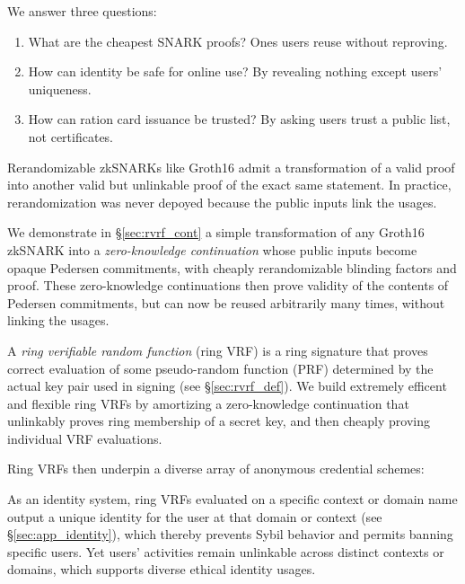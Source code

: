 
We answer three questions:
\begin{enumerate}
\item
What are the cheapest SNARK proofs?  \quad
Ones users reuse without reproving.
\item
How can identity be safe for online use?  \quad
By revealing nothing except users' uniqueness.
\item
How can ration card issuance be trusted?  \quad
By asking users trust a public list, not certificates.
\end{enumerate}

Rerandomizable zkSNARKs like Groth16 \cite{groth16} admit a
transformation of a valid proof into another valid but unlinkable
proof of the exact same statement.  In practice, rerandomization
was never depoyed because the public inputs link the usages.

We demonstrate in \S\ref{sec:rvrf_cont} a simple transformation of
any Groth16 zkSNARK into a {\it zero-knowledge continuation} whose
public inputs become opaque Pedersen commitments, with cheaply
rerandomizable blinding factors and proof.
These zero-knowledge continuations then prove validity of the contents
of Pedersen commitments, but can now be reused arbitrarily many times,
without linking the usages. 

A {\it ring verifiable random function} (ring VRF) is a ring signature
that proves correct evaluation of some pseudo-random function (PRF)
determined by the actual key pair used in signing (see \S\ref{sec:rvrf_def}).
We build extremely efficent and flexible ring VRFs by amortizing a
zero-knowledge continuation that unlinkably proves ring membership
of a secret key, and then cheaply proving individual VRF evaluations.

Ring VRFs then underpin a diverse array of anonymous credential schemes:

\smallskip

As an identity system, ring VRFs evaluated on a specific context or
domain name output a unique identity for the user at that domain or
context (see \S\ref{sec:app_identity}), which thereby prevents
Sybil behavior and permits banning specific users.
Yet users' activities remain unlinkable across distinct contexts or
domains, which supports diverse ethical identity usages.


